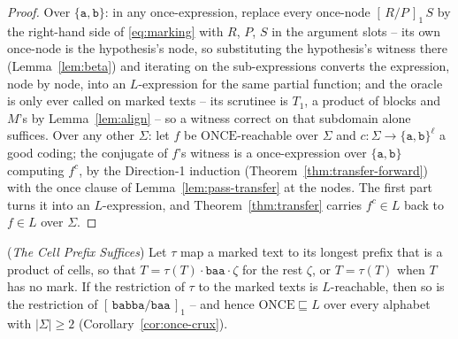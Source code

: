 \documentclass[runningheads,envcountsect]{llncs}
\begin{document}
\begin{proof}
    Over $\{\mathtt{a},\mathtt{b}\}$: in any once-expression, replace every once-node $[\,R/P\,]_1\,S$ by the right-hand side of \eqref{eq:marking} with $R$, $P$, $S$ in the argument slots -- its own once-node is the hypothesis's node, so substituting the hypothesis's witness there (Lemma~\ref{lem:beta}) and iterating on the sub-expressions converts the expression, node by node, into an $L$-expression for the same partial function; and the oracle is only ever called on marked texts -- its scrutinee is $T_1$, a product of blocks and $M$'s by Lemma~\ref{lem:align} -- so a witness correct on that subdomain alone suffices. Over any other $\Sigma$: let $f$ be $\mathrm{ONCE}$-reachable over $\Sigma$ and $c : \Sigma \rightarrow \{\mathtt{a},\mathtt{b}\}^{\ell}$ a good coding; the conjugate of $f$'s witness is a once-expression over $\{\mathtt{a},\mathtt{b}\}$ computing $f^c$, by the Direction-1 induction (Theorem~\ref{thm:transfer-forward}) with the once clause of Lemma~\ref{lem:pass-transfer} at the nodes. The first part turns it into an $L$-expression, and Theorem~\ref{thm:transfer} carries $f^c \in L$ back to $f \in L$ over $\Sigma$.
\end{proof}

\begin{proposition}
    (\emph{The Cell Prefix Suffices})
    \label{prop:cellprefix}
    Let $\tau$ map a marked text to its longest prefix that is a product of cells, so that $T = \tau(T)\cdot\mathtt{baa}\cdot\zeta$ for the rest $\zeta$, or $T = \tau(T)$ when $T$ has no mark. If the restriction of $\tau$ to the marked texts is $L$-reachable, then so is the restriction of $[\,\mathtt{babba}/\mathtt{baa}\,]_1$ -- and hence $\mathrm{ONCE} \sqsubseteq L$ over every alphabet with $|\Sigma| \geq 2$ (Corollary~\ref{cor:once-crux}).
\end{proposition}
\end{document}
